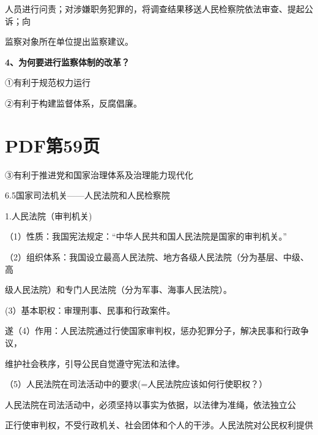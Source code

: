 \documentclass[lang=cn,11pt]{elegantbook}
\newcommand{\daofasym}[1]{{\daofasymbolfont #1}}
\newcommand{\daofasym}[1]{#1}
\begin{document}
人员进行问责；对涉嫌职务犯罪的，将调查结果移送人民检察院依法审查、提起公诉；向\par

监察对象所在单位提出监察建议。\par

\textbf{4、为何要进行监察体制的改革？}\par

\daofasym{①}有利于规范权力运行\par

\daofasym{②}有利于构建监督体系，反腐倡廉。\par


\section*{PDF第59页}

\daofasym{③}有利于推进党和国家治理体系及治理能力现代化\par

6.5国家司法机关——人民法院和人民检察院\par

1.人民法院（审判机关)\par

（1）性质：我国宪法规定：“中华人民共和国人民法院是国家的审判机关。”\par

（2）组织体系：我国设立最高人民法院、地方各级人民法院（分为基层、中级、高\par

级人民法院）和专门人民法院（分为军事、海事人民法院）。\par

(3）基本职权：审理刑事、民事和行政案件。\par

遂（4）作用：人民法院通过行使国家审判权，惩办犯罪分子，解决民事和行政争议，\par

维护社会秩序，引导公民自觉遵守宪法和法律。\par

（5）人民法院在司法活动中的要求(=人民法院应该如何行使职权？）\par

人民法院在司法活动中，必须坚持以事实为依据，以法律为准绳，依法独立公\par

正行使审判权，不受行政机关、社会团体和个人的干涉。人民法院对公民权利提供\par
\end{document}
